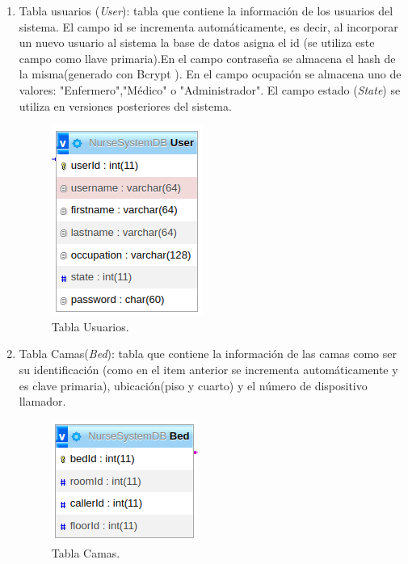 \begin{enumerate}

\item Tabla usuarios (\textit{User}): tabla que contiene la información de los usuarios del sistema. El campo id se incrementa automáticamente, es decir, al incorporar un nuevo usuario al sistema la base de datos asigna el id (se utiliza este campo como llave primaria).En el campo contraseña se almacena el hash de la misma(generado con Bcrypt \citep{WEBSITE:31}). En el campo ocupación se almacena uno de valores: "Enfermero","Médico" o "Administrador". El campo estado (\textit{State}) se utiliza en versiones posteriores del sistema.

\begin{figure}[ht]
	\centering
	\includegraphics[scale=.6]{./Figures/dB(user).png}
	\caption{Tabla Usuarios.}
	\label{fig:Tabla Usuarios (base de datos)}
\end{figure}

\item Tabla Camas(\textit{Bed}): tabla que contiene la información de las camas como ser su identificación (como en el item anterior se incrementa automáticamente y es clave primaria), ubicación(piso y cuarto) y el número de dispositivo llamador. 

\begin{figure}[ht]
	\centering
	\includegraphics[scale=.6]{./Figures/dB(bed).png}
	\caption{Tabla Camas.}
	\label{fig:Tabla Camas (base de datos)}
\end{figure}


\end{enumerate}
